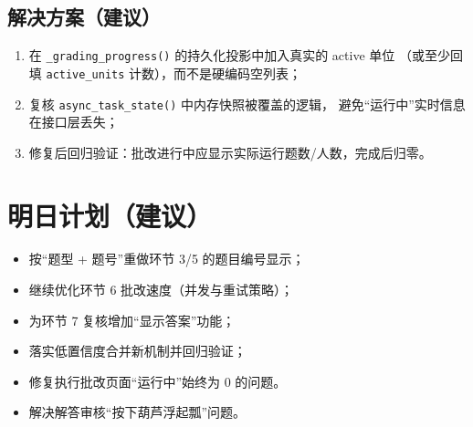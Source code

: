 \documentclass[12pt,a4paper]{ctexart}
\begin{document}
\subsection{解决方案（建议）}
\begin{enumerate}[leftmargin=2em,label=(\arabic*)]
  \item 在 \texttt{\_grading\_progress()} 的持久化投影中加入真实的 active 单位
        （或至少回填 \texttt{active\_units} 计数），而不是硬编码空列表；
  \item 复核 \texttt{async\_task\_state()} 中内存快照被覆盖的逻辑，
        避免“运行中”实时信息在接口层丢失；
  \item 修复后回归验证：批改进行中应显示实际运行题数/人数，完成后归零。
\end{enumerate}

\section*{明日计划（建议）}
\begin{itemize}[leftmargin=2em]
  \item 按“题型 + 题号”重做环节 3/5 的题目编号显示；
  \item 继续优化环节 6 批改速度（并发与重试策略）；
  \item 为环节 7 复核增加“显示答案”功能；
  \item 落实低置信度合并新机制并回归验证；
  \item 修复执行批改页面“运行中”始终为 0 的问题。
  \item 解决解答审核“按下葫芦浮起瓢”问题。
\end{itemize}
\end{document}
